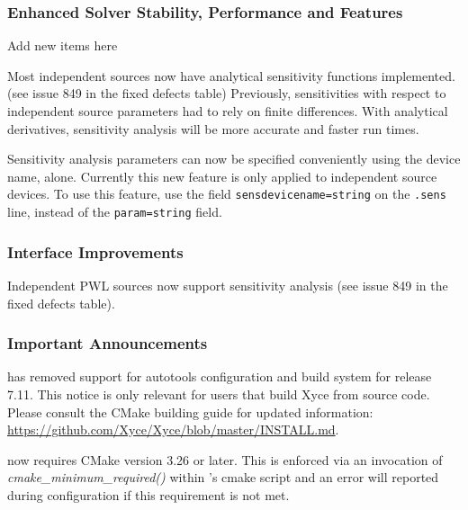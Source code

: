 \documentclass[letterpaper]{scrartcl}
\begin{document}
\subsubsection*{Enhanced Solver Stability, Performance and Features}
\begin{XyceItemize}
\item Add new items here
\item Most independent sources now have analytical sensitivity functions implemented. (see issue 849 in the fixed defects table)  Previously, sensitivities with respect to independent source parameters had to rely on finite differences.  With analytical derivatives, sensitivity analysis will be more accurate and faster run times.
  \item Sensitivity analysis parameters can now be specified conveniently using the device name, alone.  Currently this new feature is only applied to independent source devices.   To use this feature, use the field \texttt{sensdevicename=string} on the \texttt{.sens} line, instead of the \texttt{param=string} field.
\end{XyceItemize}

\subsubsection*{Interface Improvements}
\begin{XyceItemize}
\item Independent PWL sources now support sensitivity analysis (see issue 849 in the fixed defects table).
\end{XyceItemize}

\subsubsection*{Important Announcements}
\begin{XyceItemize}
  \item \Xyce{} has removed support for autotools configuration and build system for release 7.11. This notice is only relevant for users that build Xyce from source code. Please consult the CMake building guide for updated information: \newline
  {\color{XyceDeepRed}\url{https://github.com/Xyce/Xyce/blob/master/INSTALL.md}}. 
  \item \Xyce{} now requires CMake version 3.26 or later. This is enforced via an invocation of \\
    \emph{cmake\_minimum\_required()} within \Xyce{}'s cmake script and an error will reported 
    during configuration if this requirement is not met.
\end{XyceItemize}
\end{document}
